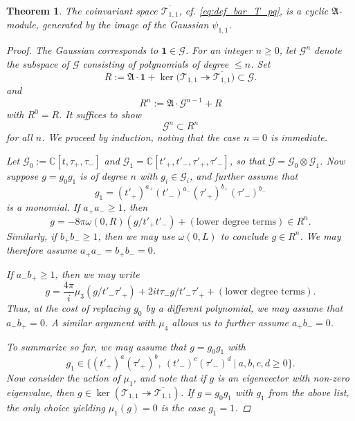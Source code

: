 \documentclass[reqno, 11pt]{amsart} %
\numberwithin{equation}{section}
\theoremstyle{plain}
\newtheorem{theorem}{Theorem}[section]
\theoremstyle{definition}
\theoremstyle{remark}
\newcommand{\ov}{\overline}
\newcommand{\mcG}{\mathcal{G}}
\newcommand{\mcT}{\mathcal{T}}
\newcommand{\mfA}{\mathfrak{A}}
\newcommand{\bbC}{\mathbb C}
\newcommand{\calG}{\mathcal G}
\newcommand{\lie}[1]{ \mathfrak{#1}}
\begin{document}
\begin{theorem}\label{thm:generator_T11}
The coinvariant space $\ov{\mcT_{1,1}}$, cf. \eqref{eq:def_bar_T_pq}, is a cyclic $\lie A$-module, generated by the image of the Gaussian $ψ_{1,1}$.
\begin{proof}
The Gaussian corresponds to $\mathbf 1 \in \mcG$. For an integer $n \geq 0$, let $\calG^n$ denote the subspace of $\calG$ consisting of polynomials of degree $\leq n$. Set
\[
R := \mfA \cdot \mathbf 1 + \ker\big(\mcT_{1,1}\twoheadrightarrow \ov{\mcT_{1,1}}\big) \subset \calG.
\]
and
\[
R^n := \mfA \cdot \calG^{n-1} + R
\]
with $R^0 = R$.
It suffices to show
\[
\calG^n \subset R^n
\]
for all $n$. We proceed by induction, noting that the case $n=0$ is immediate.

Let $\calG_0 := \bbC[ t, \tau_+, \tau_-]$ and $\calG_1 = \bbC[t'_+, t'_-, \tau'_+, \tau'_-]$, so that $\calG = \calG_0 \otimes \calG_1$. Now suppose $g  = g_0 g_1$ is of degree $n$ with $g_i \in \calG_i$, and further assume that
\[
g_1 = (t'_+)^{a_+} (t'_-)^{a_-} (\tau'_+)^{b_+} (\tau'_-)^{b_-}
\]
is a monomial. If $a_+ a_- \geq 1$, then
\[
g = -8 \pi \omega(0,R) \left( g/t'_+t'_- \right) + (\text{lower degree terms}) \in R^n.
\]
Similarly, if $b_+ b_- \geq 1$, then we may use $\omega(0,L)$ to conclude $g \in R^n$. We may therefore assume $a_+ a_- = b_+ b_- = 0$.

If $a_- b_+ \geq 1$, then we may write
\[
g = \frac{4 \pi}{i} \mu_3 (g/ t'_- \tau'_+) + 2i t \tau_- g/t'_- \tau'_+ + (\text{lower degree terms}).
\]
Thus, at the cost of replacing $g_0$ by a different polynomial, we may assume  that $a_- b_+ = 0$. A similar argument with $\mu_4$ allows us to further assume $a_+ b_- = 0$.

To summarize so far, we may assume that $g = g_0 g_1 $ with
\[
g_1 \in \{ (t'_+)^a (\tau'_+)^b, \ (t'_-)^c(\tau'_-)^d  \ | \ a,b,c,d \geq 0\}.
\]
Now consider the action of $\mu_1$, and note that if $g$ is an eigenvector with non-zero eigenvalue, then $g \in \ker(\mcT_{1,1}\twoheadrightarrow \ov{\mcT_{1,1}})$. If $g = g_0 g_1$ with $g_1 $ from the above list, the only choice yielding $\mu_1(g) = 0$ is the case $g_1 = 1$.


\end{proof}
\end{theorem}
\end{document}
